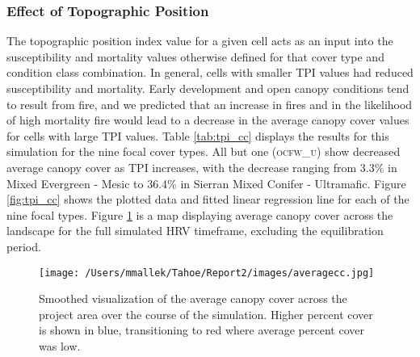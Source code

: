 \clearpage
\subsubsection{Effect of Topographic Position}

The topographic position index value for a given cell acts as an input into the susceptibility and mortality values otherwise defined for that cover type and condition class combination. In general, cells with smaller TPI values had reduced susceptibility and mortality. Early development and open canopy conditions tend to result from fire, and we predicted that an increase in fires and in the likelihood of high mortality fire would lead to a decrease in the average canopy cover values for cells with large TPI values. Table \ref{tab:tpi_cc} displays the results for this simulation for the nine focal cover types. All but one (\textsc{ocfw\_u}) show decreased average canopy cover as TPI increases, with the decrease ranging from 3.3\% in Mixed Evergreen - Mesic to 36.4\% in Sierran Mixed Conifer - Ultramafic. Figure \ref{fig:tpi_cc} shows the plotted data and fitted linear regression line for each of the nine focal types. Figure \ref{fig:averagecc}  is a map displaying average canopy cover across the landscape for the full simulated HRV timeframe, excluding the equilibration period. 

\begin{figure}[!htbp]
\centering
\texttt{[image: /Users/mmallek/Tahoe/Report2/images/averagecc.jpg]}
\caption{Smoothed visualization of the average canopy cover across the project area over the course of the simulation. Higher percent cover is shown in blue, transitioning to red where average percent cover was low.}
\label{fig:averagecc}
\end{figure}

